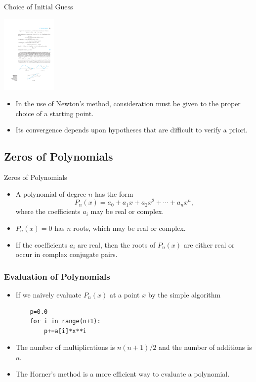 \documentclass{beamer}
\begin{document}
\begin{frame}{Choice of Initial Guess}
  \centerline{\includegraphics[height=1.5in]{Lec11_fig6.pdf}}
  \begin{itemize}
    \item In the use of Newton's method, consideration must be given to the proper choice of a starting point. 
    \item  Its convergence depends upon hypotheses that are difficult to verify a priori.
  \end{itemize}
\end{frame}

\subsection{Zeros of Polynomials}
\begin{frame}{Zeros of Polynomials}
\begin{itemize}
  \item A polynomial of degree $n$ has the form 
    $$
    P_n(x)=a_0+a_1 x+a_2 x^2+\cdots+a_n x^n,
    $$
     where the coefficients $a_i$ may be real or complex.
  \item $P_n(x)=0$ has $n$ roots, which may be real or complex.
  \item If the coefficients $a_i$ are real, then the roots of $P_n(x)$ are either real or occur in complex conjugate pairs.
\end{itemize}
\end{frame}

\begin{frame}[fragile]
  \frametitle{ Evaluation of Polynomials}
\begin{itemize}
  \item If we naively evaluate  $P_n(x)$ at a point $x$ by the simple algorithm
  \begin{verbatim}
    p=0.0
    for i in range(n+1):
        p+=a[i]*x**i
    \end{verbatim}
  \item The number of multiplications is $n(n+1)/2$ and the number of additions is $n$.
  \item The Horner's method is a more efficient way to evaluate a polynomial.
\end{itemize}
\end{frame}
\end{document}
